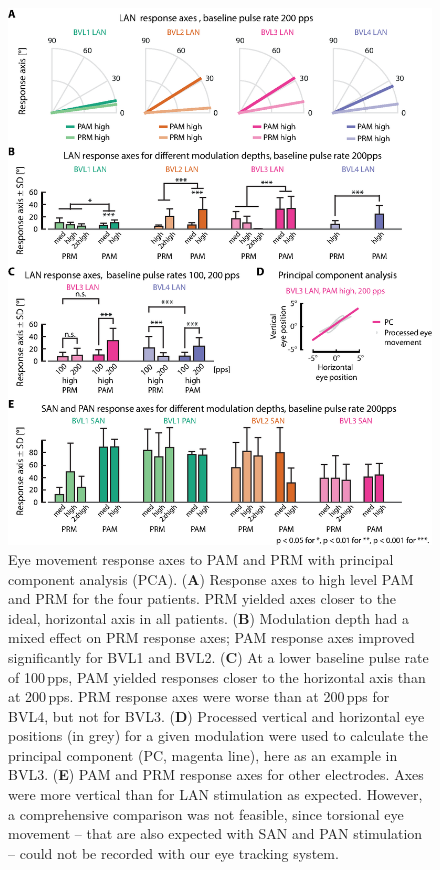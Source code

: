 \begin{figure}[btp]
\centering
\includegraphics[width=\textwidth]{chapters/partii/pamprm/figures/Fig_pamprm_angle.eps} 
\caption[Eye movement response axes to PAM and PRM]{Eye movement response axes to PAM and PRM with principal component analysis (PCA). (\textbf{A}) Response axes to high level PAM and PRM for the four patients. PRM yielded axes closer to the ideal, horizontal axis in all patients. (\textbf{B}) Modulation depth had a mixed effect on PRM response axes; PAM response axes improved significantly for BVL1 and BVL2. (\textbf{C}) At a lower baseline pulse rate of 100\,pps, PAM yielded responses closer to the horizontal axis than at 200\,pps. PRM response axes were worse than at 200\,pps for BVL4, but not for BVL3. (\textbf{D}) Processed vertical and horizontal eye positions (in grey) for a given modulation were used to calculate the principal component (PC, magenta line), here as an example in BVL3. (\textbf{E}) PAM and PRM response axes for other electrodes. Axes were more vertical than for LAN stimulation as expected. However, a comprehensive comparison was not feasible, since torsional eye movement -- that are also expected with SAN and PAN stimulation -- could not be recorded with our eye tracking system.}
\label{fig:pamprm:angle}
\end{figure}

